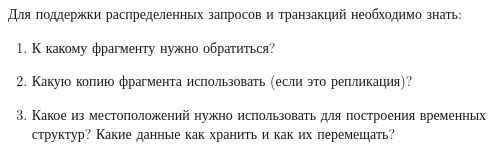 Для поддержки распределенных запросов и транзакций необходимо знать:

\begin{enumerate}
\item
  К какому фрагменту нужно обратиться?

\item
  Какую копию фрагмента использовать (если это репликация)?

\item
  Какое из местоположений нужно использовать для построения временных структур?
  Какие данные как хранить и как их перемещать?
\end{enumerate}

